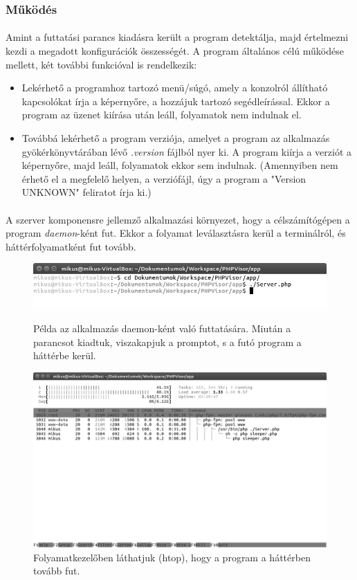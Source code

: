 \documentclass[12pt]{report}
\begin{document}
  \subsubsection{Működés}
  \paragraph{}
  Amint a futtatási parancs kiadásra került a program detektálja, majd értelmezni kezdi a megadott konfigurációk összességét.
  A program általános célú működése mellett, két további funkcióval is rendelkezik:
  \begin{itemize}
  \item Lekérhető a programhoz tartozó menü/súgó, amely a konzolról állítható kapcsolókat írja a képernyőre, a hozzájuk tartozó segédleírással. Ekkor a program az üzenet kiírása után leáll, folyamatok nem indulnak el.
  \item Továbbá lekérhető a program verziója, amelyet a program az alkalmazás gyökérkönyvtárában lévő \textit{.version} fájlból nyer ki. A program kiírja a verziót a képernyőre, majd leáll, folyamatok ekkor sem indulnak. (Amennyiben nem érhető el a megfelelő helyen, a verziófájl, úgy a program a "Version UNKNOWN" feliratot írja ki.)
  \end{itemize}
  \paragraph{}
  A szerver komponensre jellemző alkalmazási környezet, hogy a célszámítógépen a program \textit{daemon}-ként fut. Ekkor a folyamat leválasztásra kerül a terminálról, és háttérfolyamatként fut tovább. 
  \begin{figure}[ht]
  \centering
  \includegraphics[width=12cm]{pics/prompt.png}
	  \caption{Példa az alkalmazás daemon-ként való futtatására.
      Miután a parancsot kiadtuk, viszakapjuk a promptot, s a futó program a háttérbe kerül. \newline}
   \includegraphics[width=12cm]{pics/htop.png}
	  \caption{Folyamatkezelőben láthatjuk (htop), hogy a program a háttérben tovább fut.}
  \end{figure}
  
\end{document}
